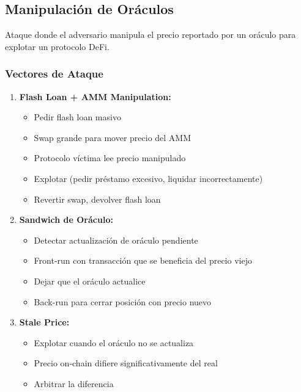 \documentclass[11pt,a4paper,twoside]{book}
\begin{document}
\subsection{Manipulaci\'on de Or\'aculos}

\begin{definition}
Ataque donde el adversario manipula el precio reportado por un or\'aculo para explotar un protocolo DeFi.
\end{definition}

\subsubsection{Vectores de Ataque}

\begin{enumerate}
    \item \textbf{Flash Loan + AMM Manipulation:}
    \begin{itemize}
        \item Pedir flash loan masivo
        \item Swap grande para mover precio del AMM
        \item Protocolo v\'ictima lee precio manipulado
        \item Explotar (pedir pr\'estamo excesivo, liquidar incorrectamente)
        \item Revertir swap, devolver flash loan
    \end{itemize}
    
    \item \textbf{Sandwich de Or\'aculo:}
    \begin{itemize}
        \item Detectar actualizaci\'on de or\'aculo pendiente
        \item Front-run con transacci\'on que se beneficia del precio viejo
        \item Dejar que el or\'aculo actualice
        \item Back-run para cerrar posici\'on con precio nuevo
    \end{itemize}
    
    \item \textbf{Stale Price:}
    \begin{itemize}
        \item Explotar cuando el or\'aculo no se actualiza
        \item Precio on-chain difiere significativamente del real
        \item Arbitrar la diferencia
    \end{itemize}
\end{enumerate}
\end{document}
